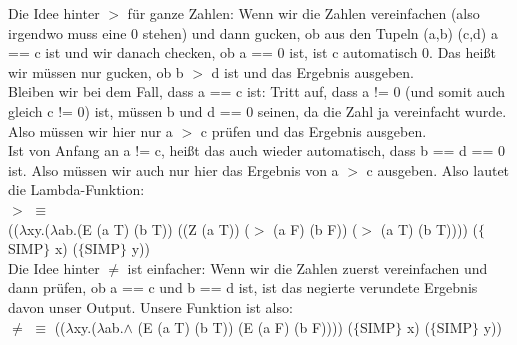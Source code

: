 \documentclass[11pt]{article}
\begin{document}
\begin{enumerate}
Die Idee hinter $>$ für ganze Zahlen:
Wenn wir die Zahlen vereinfachen (also irgendwo muss eine 0 stehen) und dann gucken, ob aus den Tupeln (a,b) (c,d) a == c ist und wir danach checken, ob a == 0 ist, ist c automatisch 0. Das heißt wir müssen nur gucken, ob b $>$ d ist und das Ergebnis ausgeben.\\ Bleiben wir bei dem Fall, dass a == c ist: Tritt auf, dass a != 0 (und somit auch gleich c != 0) ist, müssen b und d == 0 seinen, da die Zahl ja vereinfacht wurde. Also müssen wir hier nur a $>$ c prüfen und das Ergebnis ausgeben.\\
Ist von Anfang an a != c, heißt das auch wieder automatisch, dass b == d == 0 ist. Also müssen wir auch nur hier das Ergebnis von a $>$ c ausgeben. Also lautet die Lambda-Funktion: \\
$>$ $\equiv$\\ (($\lambda$xy.($\lambda$ab.(E (a T) (b T)) ((Z (a T)) ($>$ (a F) (b F)) ($>$ (a T) (b T)))) ($\lbrace$SIMP$\rbrace$ x) ($\lbrace$SIMP$\rbrace$ y))\\
Die Idee hinter $\neq$ ist einfacher: Wenn wir die Zahlen zuerst vereinfachen und dann prüfen, ob a == c und b == d ist, ist das negierte verundete Ergebnis davon unser Output. Unsere Funktion ist also: \\
$\neq$ $\equiv$ (($\lambda$xy.($\lambda$ab.$\land$ (E (a T) (b T)) (E (a F) (b F)))) ($\lbrace$SIMP$\rbrace$ x) ($\lbrace$SIMP$\rbrace$ y))
\end{enumerate}
\end{document}
